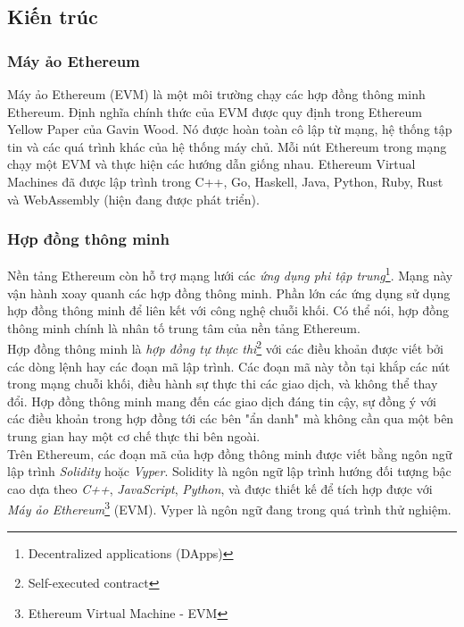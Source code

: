 \subsection{Kiến trúc}

\subsubsection*{Máy ảo Ethereum}

Máy ảo Ethereum (EVM) là một môi trường chạy các hợp đồng thông minh Ethereum. Định nghĩa chính thức của EVM được quy định trong Ethereum Yellow Paper của Gavin Wood. Nó được hoàn toàn cô lập từ mạng, hệ thống tập tin và các quá trình khác của hệ thống máy chủ. Mỗi nút Ethereum trong mạng chạy một EVM và thực hiện các hướng dẫn giống nhau. Ethereum Virtual Machines đã được lập trình trong C++, Go, Haskell, Java, Python, Ruby, Rust và WebAssembly (hiện đang được phát triển).

\subsubsection*{Hợp đồng thông minh}

Nền tảng Ethereum còn hỗ trợ mạng lưới các \textit{ứng dụng phi tập trung}\footnote{Decentralized applications (DApps)}. Mạng này vận hành xoay quanh các hợp đồng thông minh. Phần lớn các ứng dụng sử dụng hợp đồng thông minh để liên kết với công nghệ chuỗi khối. Có thể nói, hợp đồng thông minh chính là nhân tố trung tâm của nền tảng Ethereum.\\

Hợp đồng thông minh là \textit{hợp đồng tự thực thi}\footnote{Self-executed contract} với các điều khoản được viết bởi các dòng lệnh hay các đoạn mã lập trình. Các đoạn mã này tồn tại khắp các nút trong mạng chuỗi khối, điều hành sự thực thi các giao dịch, và không thể thay đổi. Hợp đồng thông minh mang đến các giao dịch đáng tin cậy, sự đồng ý với các điều khoản trong hợp đồng tới các bên "ẩn danh" mà không cần qua một bên trung gian hay một cơ chế thực thi bên ngoài.\\

Trên Ethereum, các đoạn mã của hợp đồng thông minh được viết bằng ngôn ngữ lập trình \textit{Solidity} hoặc \textit{Vyper}. Solidity là ngôn ngữ lập trình hướng đối tượng bậc cao dựa theo \textit{C++}, \textit{JavaScript}, \textit{Python}, và được thiết kế để tích hợp được với \textit{Máy ảo Ethereum}\footnote{Ethereum Virtual Machine - EVM} (EVM). Vyper là ngôn ngữ đang trong quá trình thử nghiệm.

